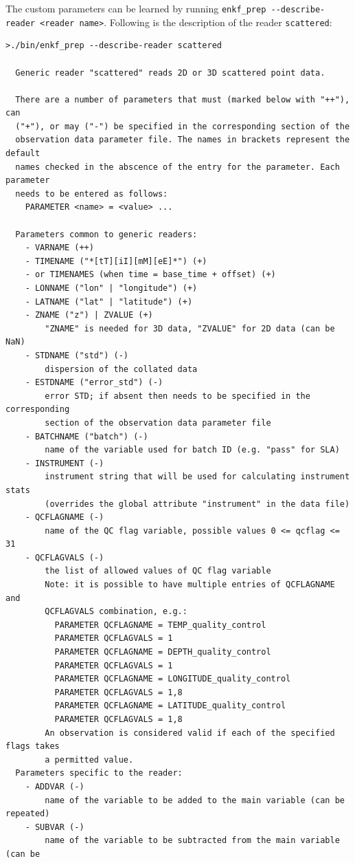 \documentclass[11pt]{report}
\begin{document}
The custom parameters can be learned by running \verb|enkf_prep --describe-reader <reader name>|.
Following is the description of the reader \verb|scattered|:
\begin{Verbatim}
>./bin/enkf_prep --describe-reader scattered

  Generic reader "scattered" reads 2D or 3D scattered point data.

  There are a number of parameters that must (marked below with "++"), can
  ("+"), or may ("-") be specified in the corresponding section of the
  observation data parameter file. The names in brackets represent the default
  names checked in the abscence of the entry for the parameter. Each parameter
  needs to be entered as follows:
    PARAMETER <name> = <value> ...

  Parameters common to generic readers:
    - VARNAME (++)
    - TIMENAME ("*[tT][iI][mM][eE]*") (+)
    - or TIMENAMES (when time = base_time + offset) (+)
    - LONNAME ("lon" | "longitude") (+)
    - LATNAME ("lat" | "latitude") (+)
    - ZNAME ("z") | ZVALUE (+)
        "ZNAME" is needed for 3D data, "ZVALUE" for 2D data (can be NaN)
    - STDNAME ("std") (-)
        dispersion of the collated data
    - ESTDNAME ("error_std") (-)
        error STD; if absent then needs to be specified in the corresponding
        section of the observation data parameter file
    - BATCHNAME ("batch") (-)
        name of the variable used for batch ID (e.g. "pass" for SLA)
    - INSTRUMENT (-)
        instrument string that will be used for calculating instrument stats
        (overrides the global attribute "instrument" in the data file)
    - QCFLAGNAME (-)
        name of the QC flag variable, possible values 0 <= qcflag <= 31
    - QCFLAGVALS (-)
        the list of allowed values of QC flag variable
        Note: it is possible to have multiple entries of QCFLAGNAME and
        QCFLAGVALS combination, e.g.:
          PARAMETER QCFLAGNAME = TEMP_quality_control
          PARAMETER QCFLAGVALS = 1
          PARAMETER QCFLAGNAME = DEPTH_quality_control
          PARAMETER QCFLAGVALS = 1
          PARAMETER QCFLAGNAME = LONGITUDE_quality_control
          PARAMETER QCFLAGVALS = 1,8
          PARAMETER QCFLAGNAME = LATITUDE_quality_control
          PARAMETER QCFLAGVALS = 1,8
        An observation is considered valid if each of the specified flags takes
        a permitted value.
  Parameters specific to the reader:
    - ADDVAR (-)
        name of the variable to be added to the main variable (can be repeated)
    - SUBVAR (-)
        name of the variable to be subtracted from the main variable (can be

\end{Verbatim}
\end{document}

